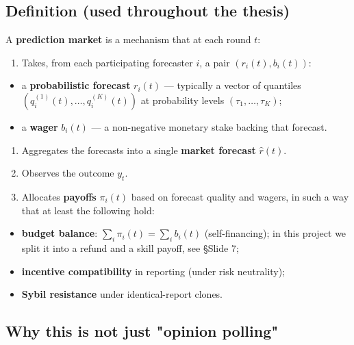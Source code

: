 \documentclass[11pt]{article}
\begin{document}
\subsection{Definition (used throughout the thesis)}


A \textbf{prediction market} is a mechanism that at each round $t$:

\begin{enumerate}
\item Takes, from each participating forecaster $i$, a pair $(r_i(t), b_i(t))$:
\end{enumerate}
\begin{itemize}
\item a \textbf{probabilistic forecast} $r_i(t)$ --- typically a vector of quantiles $(q_i^{(1)}(t), \dots, q_i^{(K)}(t))$ at probability levels $(\tau_1, \dots, \tau_K)$;
\item a \textbf{wager} $b_i(t)$ --- a non-negative monetary stake backing that forecast.
\end{itemize}

\begin{enumerate}
\item Aggregates the forecasts into a single \textbf{market forecast} $\hat r(t)$.
\item Observes the outcome $y_t$.
\item Allocates \textbf{payoffs} $\pi_i(t)$ based on forecast quality and wagers, in such a way that at least the following hold:
\end{enumerate}
\begin{itemize}
\item \textbf{budget balance}: $\sum_i \pi_i(t) = \sum_i b_i(t)$ (self-financing); in this project we split it into a refund and a skill payoff, see \S Slide 7;
\item \textbf{incentive compatibility} in reporting (under risk neutrality);
\item \textbf{Sybil resistance} under identical-report clones.
\end{itemize}

\subsection{Why this is not just "opinion polling"}
\end{document}
